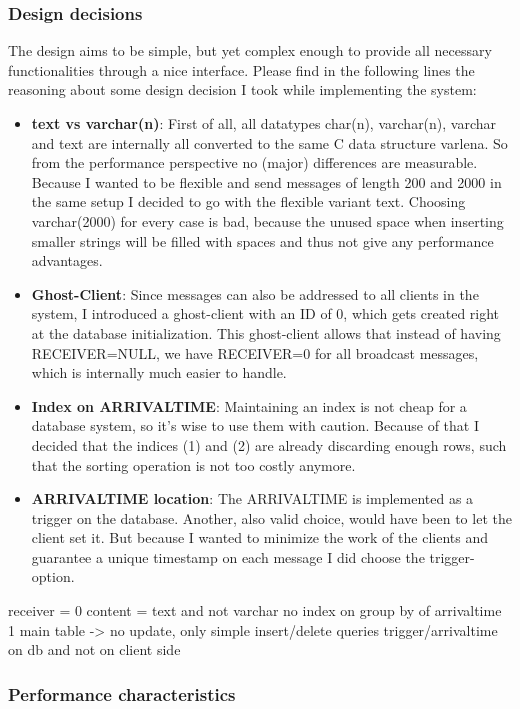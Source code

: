 \documentclass[11pt]{article}
\begin{document}
\subsubsection{Design decisions}\label{sec:design-decisions}
The design aims to be simple, but yet complex enough to provide all necessary functionalities through a nice interface. Please find in the following lines the reasoning about some design decision I took while implementing the system:
\begin{itemize}
	\item \textbf{text vs varchar(n)}: First of all, all datatypes char(n), varchar(n), varchar and text are internally all converted to the same C data structure varlena. So from the performance perspective no (major) differences are measurable. Because I wanted to be flexible and send messages of length 200 and 2000 in the same setup I decided to go with the flexible variant text. Choosing varchar(2000) for every case is bad, because the unused space when inserting smaller strings will be filled with spaces and thus not give any performance advantages.
	\item \textbf{Ghost-Client}: Since messages can also be addressed to all clients in the system, I introduced a ghost-client with an ID of 0, which gets created right at the database initialization. This ghost-client allows that instead of having RECEIVER=NULL, we have RECEIVER=0 for all broadcast messages, which is internally much easier to handle.
	\item \textbf{Index on ARRIVALTIME}: Maintaining an index is not cheap for a database system, so it's wise to use them with caution. Because of that I decided that the indices (1) and (2) are already discarding enough rows, such that the sorting operation is not too costly anymore.
	\item \textbf{ARRIVALTIME location}: The ARRIVALTIME is implemented as a trigger on the database. Another, also valid choice, would have been to let the client set it. But because I wanted to minimize the work of the clients and guarantee a unique timestamp on each message I did choose the trigger-option.
\end{itemize}
receiver = 0
content = text and not varchar
no index on group by of arrivaltime
1 main table -> no update, only simple insert/delete queries
trigger/arrivaltime on db and not on client side
\subsubsection{Performance characteristics}\label{sec:performance-characteristics}
\end{document}
